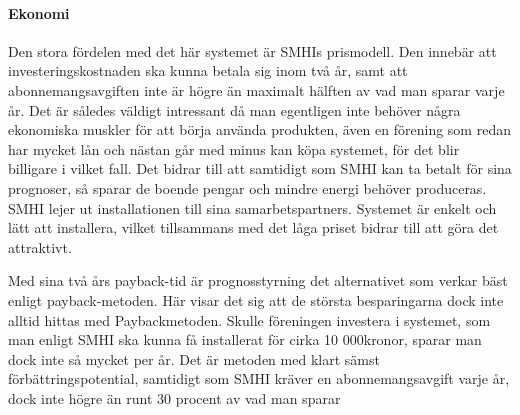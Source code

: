 \paragraph{Ekonomi}
Den stora fördelen med det här systemet är SMHIs prismodell. Den innebär att investeringskostnaden ska kunna betala sig inom två år, samt att abonnemangsavgiften inte är högre än maximalt hälften av vad man sparar varje år. Det är således väldigt intressant då man egentligen inte behöver några ekonomiska muskler för att börja använda produkten, även en förening som redan har mycket lån och nästan går med minus kan köpa systemet, för det blir billigare i vilket fall. Det bidrar till att samtidigt som SMHI kan ta betalt för sina prognoser, så sparar de boende pengar och mindre energi behöver produceras. SMHI lejer ut installationen till sina samarbetspartners. Systemet är enkelt och lätt att installera, vilket tillsammans med det låga priset bidrar till att göra det attraktivt.

Med sina två års payback-tid är prognosstyrning det alternativet som verkar bäst enligt payback-metoden. Här visar det sig att de största besparingarna dock inte alltid hittas med Paybackmetoden. Skulle föreningen investera i systemet, som man enligt SMHI ska kunna få installerat för cirka 10 000kronor, sparar man dock inte så mycket per år. Det är metoden med klart sämst förbättringspotential, samtidigt som SMHI kräver en abonnemangsavgift varje år, dock inte högre än runt 30 procent av vad man sparar

